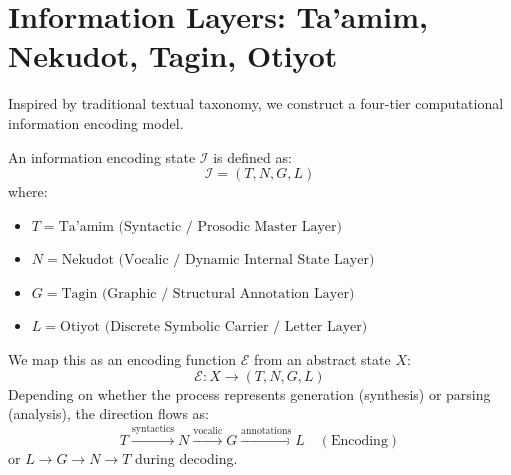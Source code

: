 \section{Information Layers: Ta'amim, Nekudot, Tagin, Otiyot}
\label{sec:taamim_nekudot_tagin_otiyot}

Inspired by traditional textual taxonomy, we construct a four-tier computational information encoding model.

\begin{definition}
An information encoding state $\mathcal{I}$ is defined as:
\begin{equation}
\mathcal{I} = (T, N, G, L)
\end{equation}
where:
\begin{itemize}
    \item $T = \text{Ta'amim (Syntactic / Prosodic Master Layer)}$
    \item $N = \text{Nekudot (Vocalic / Dynamic Internal State Layer)}$
    \item $G = \text{Tagin (Graphic / Structural Annotation Layer)}$
    \item $L = \text{Otiyot (Discrete Symbolic Carrier / Letter Layer)}$
\end{itemize}
\end{definition}

We map this as an encoding function $\mathcal{E}$ from an abstract state $X$:
\begin{equation}
\mathcal{E} : X \longrightarrow (T, N, G, L)
\end{equation}
Depending on whether the process represents generation (synthesis) or parsing (analysis), the direction flows as:
\begin{equation}
T \xrightarrow{\text{syntactics}} N \xrightarrow{\text{vocalic}} G \xrightarrow{\text{annotations}} L \quad (\text{Encoding})
\end{equation}
or $L \to G \to N \to T$ during decoding.

